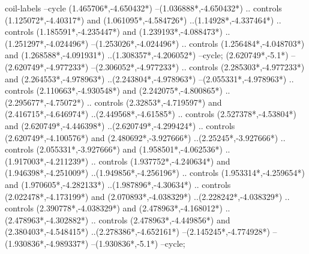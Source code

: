 {\begin{scope}[x=1mm,y=1mm,line width=\SCstroke mm,line cap=round,line join=round]
\begin{SCpart}{coil-labels}
--cycle
({1.465706*\SCF},{-4.650432*\SCF})
--({1.036888*\SCF},{-4.650432*\SCF})
.. controls ({1.125072*\SCF},{-4.40317*\SCF}) and ({1.061095*\SCF},{-4.584726*\SCF}) ..({1.14928*\SCF},{-4.337464*\SCF})
.. controls ({1.185591*\SCF},{-4.235447*\SCF}) and ({1.239193*\SCF},{-4.088473*\SCF}) ..({1.251297*\SCF},{-4.024496*\SCF})
--({1.253026*\SCF},{-4.024496*\SCF})
.. controls ({1.256484*\SCF},{-4.048703*\SCF}) and ({1.268588*\SCF},{-4.091931*\SCF}) ..({1.308357*\SCF},{-4.206052*\SCF})
--cycle;
 ({2.620749*\SCF},{-5.1*\SCF})
--({2.620749*\SCF},{-4.977233*\SCF})
--({2.306052*\SCF},{-4.977233*\SCF})
.. controls ({2.285303*\SCF},{-4.977233*\SCF}) and ({2.264553*\SCF},{-4.978963*\SCF}) ..({2.243804*\SCF},{-4.978963*\SCF})
--({2.055331*\SCF},{-4.978963*\SCF})
.. controls ({2.110663*\SCF},{-4.930548*\SCF}) and ({2.242075*\SCF},{-4.800865*\SCF}) ..({2.295677*\SCF},{-4.75072*\SCF})
.. controls ({2.32853*\SCF},{-4.719597*\SCF}) and ({2.416715*\SCF},{-4.646974*\SCF}) ..({2.449568*\SCF},{-4.61585*\SCF})
.. controls ({2.527378*\SCF},{-4.53804*\SCF}) and ({2.620749*\SCF},{-4.446398*\SCF}) ..({2.620749*\SCF},{-4.299424*\SCF})
.. controls ({2.620749*\SCF},{-4.100576*\SCF}) and ({2.480692*\SCF},{-3.927666*\SCF}) ..({2.25245*\SCF},{-3.927666*\SCF})
.. controls ({2.055331*\SCF},{-3.927666*\SCF}) and ({1.958501*\SCF},{-4.062536*\SCF}) ..({1.917003*\SCF},{-4.211239*\SCF})
.. controls ({1.937752*\SCF},{-4.240634*\SCF}) and ({1.946398*\SCF},{-4.251009*\SCF}) ..({1.949856*\SCF},{-4.256196*\SCF})
.. controls ({1.953314*\SCF},{-4.259654*\SCF}) and ({1.970605*\SCF},{-4.282133*\SCF}) ..({1.987896*\SCF},{-4.30634*\SCF})
.. controls ({2.022478*\SCF},{-4.173199*\SCF}) and ({2.070893*\SCF},{-4.038329*\SCF}) ..({2.228242*\SCF},{-4.038329*\SCF})
.. controls ({2.390778*\SCF},{-4.038329*\SCF}) and ({2.478963*\SCF},{-4.168012*\SCF}) ..({2.478963*\SCF},{-4.302882*\SCF})
.. controls ({2.478963*\SCF},{-4.449856*\SCF}) and ({2.380403*\SCF},{-4.548415*\SCF}) ..({2.278386*\SCF},{-4.652161*\SCF})
--({2.145245*\SCF},{-4.774928*\SCF})
--({1.930836*\SCF},{-4.989337*\SCF})
--({1.930836*\SCF},{-5.1*\SCF})
--cycle;
\end{SCpart}
\end{scope}
}

